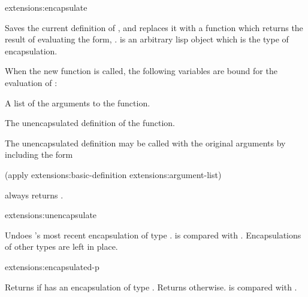 \begin{defun}{extensions:}{encapsulate}{%
    }
  
  Saves the current definition of , and replaces it with a
  function which returns the result of evaluating the form,
  .   is an arbitrary lisp object which is the
  type of encapsulation.
  
  When the new function is called, the following variables are bound
  for the evaluation of :
  \begin{Lentry}
    
  \item[\code{extensions:argument-list}] A list of the arguments to
    the function.
    
  \item[\code{extensions:basic-definition}] The unencapsulated
    definition of the function.
  \end{Lentry}
  The unencapsulated definition may be called with the original
  arguments by including the form
  \begin{lisp}
    (apply extensions:basic-definition extensions:argument-list)
  \end{lisp}

   always returns .
\end{defun}

\begin{defun}{extensions:}{unencapsulate}{}
  
  Undoes 's most recent encapsulation of type .
   is compared with .  Encapsulations of other
  types are left in place.
\end{defun}

\begin{defun}{extensions:}{encapsulated-p}{%
    }
  
  Returns \true{} if  has an encapsulation of type
  .  Returns \nil{} otherwise.   is compared with
  .
\end{defun}


